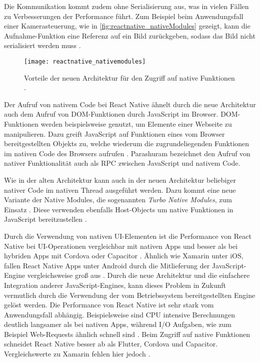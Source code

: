 Die Kommunikation kommt zudem ohne Serialisierung aus, was in vielen Fällen zu Verbesserungen der Performance führt.
Zum Beispiel beim Anwendungsfall einer Kamerasteuerung, wie in \autoref{fig:reactnative_nativeModules} gezeigt, kann die Aufnahme-Funktion eine Referenz auf ein Bild zurückgeben, sodass das Bild nicht serialisiert werden muss \cite{Parashuram_React}.
\begin{figure}[ht]
  \centering
  \texttt{[image: reactnative\_nativemodules]}
  \caption{Vorteile der neuen Architektur für den Zugriff auf native Funktionen \cite{Parashuram_React}.}
  \label{fig:reactnative_nativeModules}  
\end{figure}
Der Aufruf von nativem Code bei React Native ähnelt durch die neue Architektur auch dem Aufruf von \ac{DOM}-Funktionen durch JavaScript im Browser.
\ac{DOM}-Funktionen werden beispielsweise genutzt, um Elemente einer Webseite zu manipulieren.
Dazu greift JavaScript auf Funktionen eines vom Browser bereitgestellten Objekts zu, welche wiederum die zugrundeliegenden Funktionen im nativen Code des Browsers aufrufen \cite{ReactNative_newArchitecture}.
Parashuram \cite{Parashuram_React} bezeichnet den Aufruf von nativer Funktionalität auch als \ac{RPC} zwischen JavaScript und nativem Code.


Wie in der alten Architektur kann auch in der neuen Architektur beliebiger nativer Code im nativen Thread ausgeführt werden.
Dazu kommt eine neue Variante der Native Modules, die sogenannten \textit{Turbo Native Modules}, zum Einsatz \cite{ReactNative_TurboModules}.
Diese verwenden ebenfalls Host-Objects um native Funktionen in JavaScript bereitzustellen \cite{Parashuram_React}.


Durch die Verwendung von nativen \ac{UI}-Elementen ist die Performance von React Native bei \ac{UI}-Operationen vergleichbar mit nativen Apps und besser als bei hybriden Apps mit Cordova oder Capacitor \cite{Huber_UI}.
Ähnlich wie Xamarin unter iOS, fallen React Native Apps unter Android durch die Mitlieferung der JavaScript-Engine vergleichsweise groß aus \cite{Nawrocki_Comparison_Hybrid_Native_Frameworks}.
Durch die neue Architektur und die einfachere Integration anderer JavaScript-Engines, kann dieses Problem in Zukunft vermutlich durch die Verwendung der vom Betriebssystem bereitgestellten Engine gelöst werden.
Die Performance von React Native ist sehr stark vom Anwendungsfall abhängig.
Beispielsweise sind \ac{CPU} intensive Berechnungen deutlich langsamer als bei nativen Apps, während \ac{I/O} Aufgaben, wie zum Beispiel Web-Requests ähnlich schnell sind \cite{Nawrocki_Comparison_Hybrid_Native_Frameworks}.
Beim Zugriff auf native Funktionen schneidet React Native besser ab als Flutter, Cordova und Capacitor.
Vergleichswerte zu Xamarin fehlen hier jedoch \cite{Biorn-Hansen_PerformanceOverhead_CrossPlatform}.

